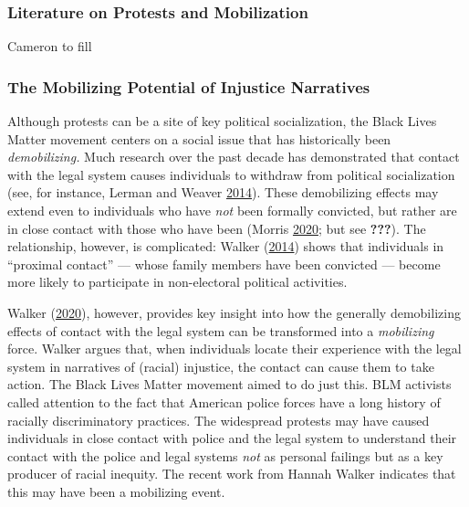 \documentclass[
  12pt,
]{article}
\begin{document}
\hypertarget{literature-on-protests-and-mobilization}{%
\subsubsection*{Literature on Protests and Mobilization}\label{literature-on-protests-and-mobilization}}

Cameron to fill

\hypertarget{the-mobilizing-potential-of-injustice-narratives}{%
\subsubsection*{The Mobilizing Potential of Injustice Narratives}\label{the-mobilizing-potential-of-injustice-narratives}}

Although protests can be a site of key political socialization, the Black Lives Matter movement centers on a social issue that has historically been \emph{demobilizing.} Much research over the past decade has demonstrated that contact with the legal system causes individuals to withdraw from political socialization (see, for instance, Lerman and Weaver \protect\hyperlink{ref-Lerman2014}{2014}). These demobilizing effects may extend even to individuals who have \emph{not} been formally convicted, but rather are in close contact with those who have been (Morris \protect\hyperlink{ref-Morris2020}{2020}; but see {\textbf{???}}). The relationship, however, is complicated: Walker (\protect\hyperlink{ref-Walker2014}{2014}) shows that individuals in ``proximal contact'' --- whose family members have been convicted --- become more likely to participate in non-electoral political activities.

Walker (\protect\hyperlink{ref-Walker2020}{2020}), however, provides key insight into how the generally demobilizing effects of contact with the legal system can be transformed into a \emph{mobilizing} force. Walker argues that, when individuals locate their experience with the legal system in narratives of (racial) injustice, the contact can cause them to take action. The Black Lives Matter movement aimed to do just this. BLM activists called attention to the fact that American police forces have a long history of racially discriminatory practices. The widespread protests may have caused individuals in close contact with police and the legal system to understand their contact with the police and legal systems \emph{not} as personal failings but as a key producer of racial inequity. The recent work from Hannah Walker indicates that this may have been a mobilizing event.
\end{document}
